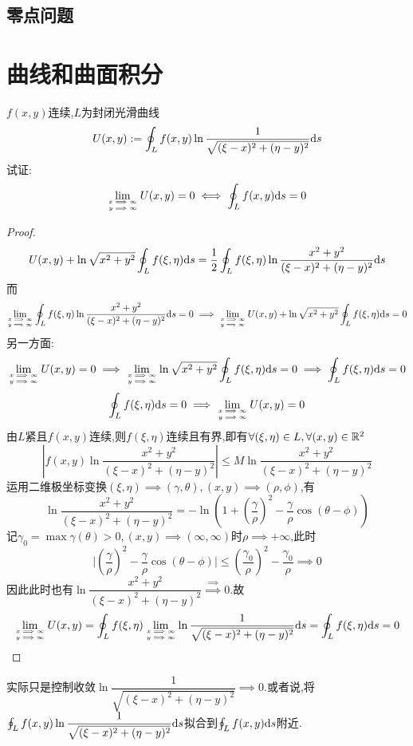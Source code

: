 \documentclass[UTF8]{book}
\begin{document}
    \section*{零点问题}
    \chapter{曲线和曲面积分}
    \begin{example}
        $f(x,y)$连续,$L$为封闭光滑曲线\[U(x,y):=\oint_L f(x,y)\ln\frac{1}{\sqrt{(\xi-x)^2+(\eta-y)^2}}\mathrm{d} s\]试证:\[\lim_{x\implies \infty\atop y\implies \infty}U(x,y)=0\iff \oint_L f(x,y)\mathrm{d} s=0\]
        \begin{proof}
            \[U(x,y)+\ln\sqrt{x^2+y^2}\oint_L f(\xi,\eta)\mathrm{d} s=\frac{1}{2}\oint_L f(\xi,\eta)\ln \frac{x^2+y^2}{(\xi-x)^2+(\eta-y)^2}\mathrm{d} s\]
            而\[\lim_{x\implies \infty\atop y\implies \infty} \oint_L f(\xi,\eta)\ln \frac{x^2+y^2}{(\xi-x)^2+(\eta-y)^2}\mathrm{d} s=0\implies \lim_{x\implies \infty\atop y\implies \infty} U(x,y)+\ln\sqrt{x^2+y^2}\oint_L f(\xi,\eta)\mathrm{d} s=0\]
            另一方面:\[\lim_{x\implies \infty\atop y\implies \infty} U(x,y)=0\implies \lim_{x\implies \infty\atop y\implies \infty}\ln\sqrt{x^2+y^2}\oint_L f(\xi,\eta)\mathrm{d} s=0\implies \oint_L f(\xi,\eta)\mathrm{d} s=0\]
            \[\oint_L f(\xi,\eta)\mathrm{d} s=0\implies \lim_{x\implies \infty\atop y\implies \infty}U(x,y)=0\]
            由$L$紧且$f(x,y)$连续,则$f(\xi,\eta)$连续且有界,即有$\forall (\xi,\eta)\in L,\forall (x,y)\in \mathbb{R}^2$\[|f(x,y)\ln\frac{x^2+y^2}{(\xi-x)^2+(\eta-y)^2}|\leq M\ln\frac{x^2+y^2}{(\xi-x)^2+(\eta-y)^2}\]
            运用二维极坐标变换$(\xi,\eta)\implies (\gamma,\theta),(x,y)\implies (\rho,\phi)$,有\[\ln\frac{x^2+y^2}{(\xi-x)^2+(\eta-y)^2}=-\ln\left( 1+\left( \frac{\gamma}{\rho} \right)^2-\frac{\gamma}{\rho}\cos(\theta-\phi) \right)\]
            记$\gamma_0=\max \gamma(\theta)>0,(x,y)\implies(\infty,\infty)$时$\rho\implies +\infty$,此时\[\Big|\left( \frac{\gamma}{\rho} \right)^2-\frac{\gamma}{\rho}\cos(\theta-\phi)\Big|\leq \left( \frac{\gamma_0}{\rho} \right)^2-\frac{\gamma_0}{\rho}\implies 0\]
            因此此时也有$\ln\dfrac{x^2+y^2}{(\xi-x)^2+(\eta-y)^2}\stackrel{\implies}{\implies}0$.故\[\lim_{x\implies \infty\atop y\implies \infty}U(x,y)=\oint_L f(\xi,\eta)\lim_{x\implies \infty\atop y\implies \infty}\ln\frac{1}{\sqrt{(\xi-x)^2+(\eta-y)^2}}\mathrm{d} s=\oint_L f(\xi,\eta)\mathrm{d} s=0\]
        \end{proof}
        实际只是控制收敛$\ln\dfrac{1}{\sqrt{(\xi-x)^2+(\eta-y)^2}}\implies 0$.或者说,将$\oint_L f(x,y)\ln\dfrac{1}{\sqrt{(\xi-x)^2+(\eta-y)^2}}\mathrm{d} s$拟合到$\oint_L f(x,y)\mathrm{d} s$附近.

\end{example}
\end{document}
